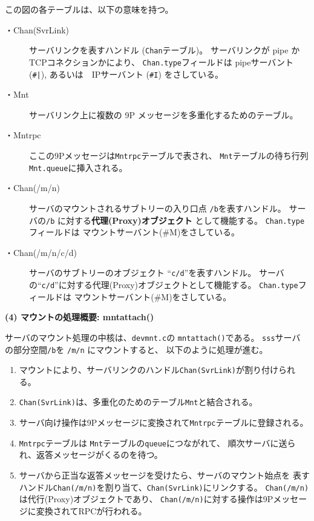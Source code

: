 この図の各テーブルは、以下の意味を持つ。
\begin{description}
\item[・Chan(SvrLink)] 
  サーバリンクを表すハンドル ({\tt Chan}テーブル)。
  サーバリンクが pipe か　TCPコネクションかにより、
  {\tt Chan.type}フィールドは pipeサーバント(\verb$#|$), 
  あるいは　IPサーバント (\verb$#I$) をさしている。
 
\item[・Mnt] 
  サーバリンク上に複数の 9P メッセージを多重化するためのテーブル。

\item[・Mntrpc] 
  ここの9Pメッセージは{\tt Mntrpc}テーブルで表され、
  {\tt Mnt}テーブルの待ち行列 {\tt Mnt.queue}に挿入される。

\item[・Chan(/m/n)] 
  サーバのマウントされるサブトリーの入り口点 {\tt /b}を表すハンドル。
  サーバの{\tt /b} に対する{\bf 代理(Proxy)オブジェクト} として機能する。
  {\tt Chan.type}フィールドは マウントサーバント(\#M)をさしている。

\item[・Chan(/m/n/c/d)] 
  サーバのサブトリーのオブジェクト ``{\tt c/d}''を表すハンドル。
  サーバの``{\tt c/d}''に対する代理(Proxy)オブジェクトとして機能する。
  {\tt Chan.type}フィールドは マウントサーバント(\#M)をさしている。

\end{description}


{\bf\flushleft (4) マウントの処理概要: mntattach()}

  サーバのマウント処理の中核は、{\tt devmnt.c}の {\tt mntattach()}である。
 {\tt sss}サーバ の部分空間{\tt /b}を {\tt /m/n} にマウントすると、
以下のように処理が進む。


\begin{enumerate}
\item  
   マウントにより、サーバリンクのハンドル{\tt Chan(SvrLink)}が割り付けられる。

\item  
    {\tt Chan(SvrLink)}は、多重化のためのテーブル{\tt Mnt}と結合される。

\item
   サーバ向け操作は9Pメッセージに変換されて{\tt Mntrpc}テーブルに登録される。

\item  
   {\tt Mntrpc}テーブルは {\tt Mnt}テーブルの{\tt queue}につながれて、
   順次サーバに送られ、返答メッセージがくるのを待つ。

\item
   サーバから正当な返答メッセージを受けたら、サーバのマウント始点を
   表すハンドル{\tt Chan(/m/n)}を割り当て、{\tt Chan(SvrLink)}にリンクする。
   {\tt Chan(/m/n)}は代行(Proxy)オブジェクトであり、
   {\tt Chan(/m/n)}に対する操作は9Pメッセージに変換されてRPCが行われる。

\end{enumerate}



